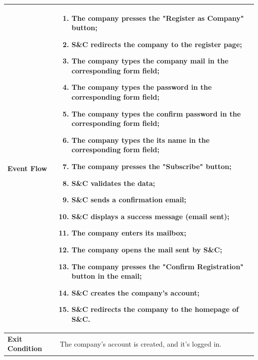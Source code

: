 \begin{enumerate}[label=\textbf{[US\arabic*]}, left = 0pt, align = left, resume]
\begin{longtable}{|l|p{11cm}|}
                \textbf{Event Flow} &
                    \begin{enumerate}[label=\arabic*., itemsep=0.2em]
                        \item The company presses the "Register as Company" button;
                        \item S\&C redirects the company to the register page;
                        \item The company types the company mail in the corresponding form field;
                        \item The company types the password in the corresponding form field;
                        \item The company types the confirm password in the corresponding form field;
                        \item The company types the its name in the corresponding form field;
                        \item The company presses the "Subscribe" button;
                        \item S\&C validates the data;
                        \item S\&C sends a confirmation email;
                        \item S\&C displays a success message (email sent);
                        \item The company enters its mailbox;
                        \item The company opens the mail sent by S\&C;
                        \item The company presses the "Confirm Registration" button in the email;
                        \item S\&C creates the company's account;
                        \item S\&C redirects the company to the homepage of S\&C.
                    \end{enumerate} \\
                \hline
                
                \textbf{Exit Condition} & 
                    The company's account is created, and it's logged in. \\
                \hline
                

\end{longtable}
\end{enumerate}
